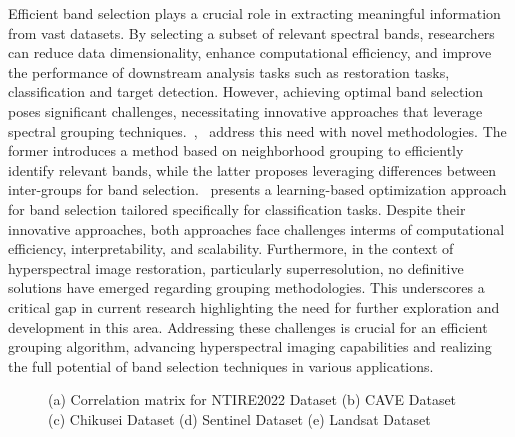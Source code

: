 Efficient band selection plays a crucial role in extracting meaningful information from vast datasets. By selecting a subset of relevant spectral bands, researchers can reduce data dimensionality, enhance computational efficiency, and improve the performance of downstream analysis tasks such as restoration tasks, classification and target detection. However, achieving optimal band selection poses significant challenges, necessitating innovative approaches that leverage spectral grouping techniques.~\cite{9153939},~\cite{10036355} address this need with novel methodologies. The former introduces a method based on neighborhood grouping to efficiently identify relevant bands, while the latter proposes leveraging differences between inter-groups for band selection.~\cite{ayna2023learning} presents a learning-based optimization approach for band selection tailored specifically for classification tasks. Despite their innovative approaches, both approaches face challenges interms of computational efficiency, interpretability, and scalability. Furthermore, in the context of hyperspectral image restoration, particularly superresolution, no definitive solutions have emerged regarding grouping methodologies. This underscores a critical gap in current research highlighting the need for further exploration and development in this area. Addressing these challenges is crucial for an efficient grouping algorithm, advancing hyperspectral imaging capabilities and realizing the full potential of band selection techniques in various applications.
\begin{figure}[h]
    \centering
    \caption{(a) Correlation matrix for NTIRE2022 Dataset (b) CAVE Dataset (c) Chikusei Dataset (d) Sentinel Dataset (e) Landsat Dataset}
    \label{fig:foobar}
\end{figure}
